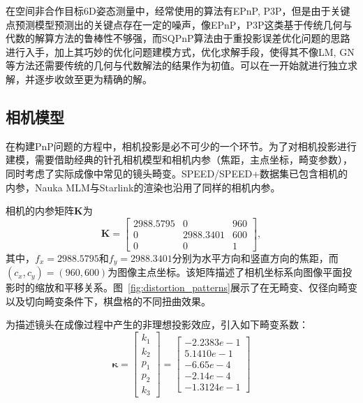 在空间非合作目标6D姿态测量中，经常使用的算法有EPnP, P3P，但是由于关键点预测模型预测出的关键点存在一定的噪声，像EPnP，P3P这类基于传统几何与代数的解算方法的鲁棒性不够强，而SQPnP算法\cite{terzakis2020consistently}由于重投影误差优化问题的思路进行入手，加上其巧妙的优化问题建模方式，优化求解手段，使得其不像LM, GN等方法还需要传统的几何与代数解法的结果作为初值。可以在一开始就进行独立求解，并逐步收敛至更为精确的解。
\subsection{相机模型}
在构建PnP问题的方程中，相机投影是必不可少的一个环节。为了对相机投影进行建模，需要借助经典的针孔相机模型和相机内参（焦距，主点坐标，畸变参数），同时考虑了实际成像中常见的镜头畸变。SPEED/SPEED+数据集已包含相机的内参，Nauka MLM与Starlink的渲染也沿用了同样的相机内参。



相机的内参矩阵$\mathbf{K}$为
\begin{equation}
	\mathbf{K} =  
	\begin{bmatrix}
		2988.5795 & 0 & 960 \\
		0 & 2988.3401 & 600 \\
		0 & 0 & 1
	\end{bmatrix},
	\label{eq:cameraMatrix}
\end{equation}
其中，$f_x=2988.5795$和$f_y=2988.3401$分别为水平方向和竖直方向的焦距，而$(c_x, c_y)=(960,600)$为图像主点坐标。该矩阵描述了相机坐标系向图像平面投影时的缩放和平移关系。图~\ref{fig:distortion_patterns}展示了在无畸变、仅径向畸变以及切向畸变条件下，棋盘格的不同扭曲效果。


为描述镜头在成像过程中产生的非理想投影效应，引入如下畸变系数：
\begin{equation}
	\boldsymbol{\kappa} =
	\begin{bmatrix}
		k_1 \\[2pt] k_2 \\[2pt] p_1 \\[2pt] p_2 \\[2pt] k_3
	\end{bmatrix}
	=
	\begin{bmatrix}
		-2.2383e-1\\[2pt]
		5.1410e-1\\[2pt]
		-6.65e-4\\[2pt]
		-2.14e-4\\[2pt]
		-1.3124e-1
	\end{bmatrix}
\end{equation}


